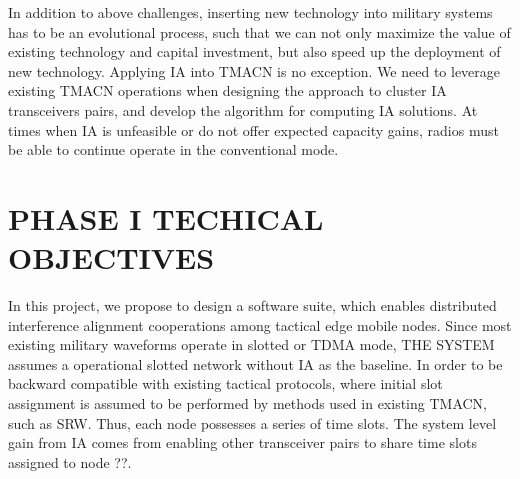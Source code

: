 \documentclass[letterpaper,11pt,onecolumn]{article}
\begin{document}
In addition to above challenges, inserting new technology into military systems has to be an evolutional process, such that we can not only maximize the value of existing technology and capital investment, but also speed up the deployment of new technology. Applying IA into TMACN is no exception. We need to leverage existing TMACN operations when designing the approach to cluster IA transceivers pairs, and develop the algorithm for computing IA solutions. At times when IA is unfeasible or do not offer expected capacity gains, radios must be able to continue operate in the conventional mode.


\section{PHASE I TECHICAL OBJECTIVES}


In this project, we propose to design a software suite, which enables distributed interference alignment cooperations among tactical edge mobile nodes.  Since most existing military waveforms operate in slotted or TDMA mode, THE SYSTEM assumes a operational slotted network without IA as the baseline. In order to be backward compatible with existing tactical protocols,  where initial slot assignment is assumed to be performed by methods used in existing TMACN, such as SRW. Thus, each node possesses a series of time slots. The system level gain from IA comes from enabling other transceiver pairs to share time slots assigned to node ??. 
\end{document}
